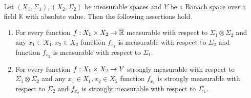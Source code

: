 \begin{proposition}\label{proposition:measurable_functions_have_measurable_sections}
Let $(X_1,\Sigma_1), (X_2,\Sigma_2)$ be measurable spaces and $Y$ be a Banach space over a field $\mathbb{K}$ with absolute value. Then the following assertions hold.
\begin{enumerate}[label=\emph{\textbf{(\arabic*)}}, leftmargin=*]
\item For every function $f:X_1\times X_2\rightarrow \overline{{\mathbb R}}$ measurable with respect to $\Sigma_1\otimes \Sigma_2$ and any $x_1\in X_1,x_2\in X_2$ function $f_{x_1}$ is measurable with respect to $\Sigma_2$ and function $f_{x_2}$ is measurable with respect to $\Sigma_1$.
\item For every function $f:X_1\times X_2\rightarrow Y$ strongly measurable with respect to $\Sigma_1\otimes \Sigma_2$ and any $x_1\in X_1,x_2\in X_2$ function $f_{x_1}$ is strongly measurable with respect to $\Sigma_2$ and $f_{x_2}$ is strongly measurable with respect to $\Sigma_1$.
\end{enumerate}
\end{proposition}
